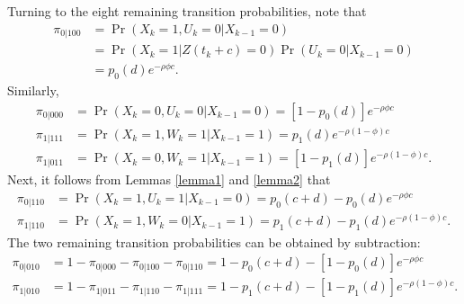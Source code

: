\documentclass[man, noextraspace, floatsintext]{apa6}\usepackage[]{graphicx}\usepackage[]{color}
\begin{document}
Turning to the eight remaining transition probabilities, note that
\begin{align*}
\pi_{0|100} &= \Pr\left(X_k = 1, U_k = 0 | X_{k-1} = 0\right) \\
&= \Pr\left(X_k = 1 | Z(t_k + c) = 0\right) \Pr\left(U_k = 0 | X_{k-1} = 0\right) \\
&= p_0(d)e^{-\rho \phi c}.
\end{align*}
Similarly,
\begin{align*}
\pi_{0|000} &= \Pr\left(X_k = 0, U_k = 0 | X_{k-1} = 0\right) = \left[1 - p_0(d)\right]e^{-\rho \phi c} \\
\pi_{1|111} &= \Pr\left(X_k = 1, W_k = 1 | X_{k-1} = 1\right) = p_1(d)e^{-\rho (1 - \phi) c} \\
\pi_{1|011} &= \Pr\left(X_k = 0, W_k = 1 | X_{k-1} = 1\right) = \left[1 - p_1(d)\right]e^{-\rho (1 - \phi) c}.
\end{align*}
Next, it follows from Lemmas \ref{lemma1} and \ref{lemma2} that
\begin{align*}
\pi_{0|110} &= \Pr\left(X_k = 1, U_k = 1 | X_{k-1} = 0\right) = p_0(c + d) - p_0(d) e^{-\rho \phi c} \\
\pi_{1|110} &= \Pr\left(X_k = 1, W_k = 0 | X_{k-1} = 1\right) = p_1(c + d) - p_1(d) e^{-\rho (1 - \phi) c}.
\end{align*}
The two remaining transition probabilities can be obtained by subtraction:
\begin{align*}
\pi_{0|010} &= 1 - \pi_{0|000} - \pi_{0|100} - \pi_{0|110} = 1 - p_0(c + d) - \left[1 - p_0(d)\right]e^{-\rho \phi c} \\
\pi_{1|010} &= 1 - \pi_{1|011} - \pi_{1|110} - \pi_{1|111} = 1 - p_1(c + d) - \left[1 - p_1(d)\right]e^{-\rho (1 - \phi) c}.
\end{align*}
\end{document}
